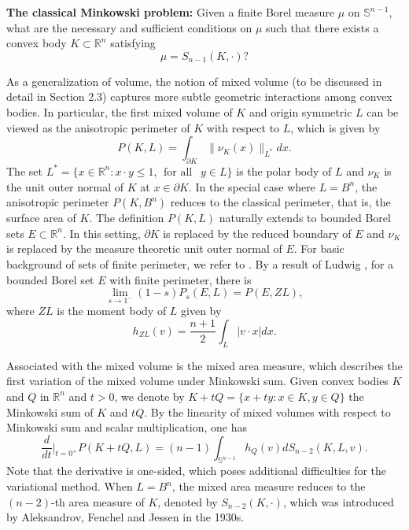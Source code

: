 \documentclass[12pt, oneside,reqno]{amsart}
\numberwithin{equation}{section}
\newtheorem{definition and theorem}[theorem]{Definition and Theorem}
\theoremstyle{plain}
\theoremstyle{remark}
\theoremstyle{definition}
\newcommand{\sn}{{\mathbb S}^{n-1}}
\newcommand{\rn}{\mathbb R^n}
\begin{document}
\noindent\textbf{The classical Minkowski problem:} Given a finite Borel measure $ \mu $ on $ \sn $, what are the necessary and sufficient conditions on $ \mu $ such that there exists a convex body $ K \subset \mathbb{R}^n $ satisfying
\[
\mu = S_{n-1}(K, \cdot)?
\]


As a generalization of volume, the notion of mixed volume (to be discussed in detail in Section 2.3) captures more subtle geometric interactions among convex bodies. In particular,  the first mixed volume of $K$ and origin symmetric $L$ can be viewed as the anisotropic perimeter of $K$ with respect to $L$, which is given by
\begin{equation}\label{ani per}
P(K,L)=\int_{\partial K}\|\nu_K(x)\|_{L^*}dx.
\end{equation}
The set $L^*=\{x\in\rn: x\cdot y  \leq 1,~~\text{for all }~~y\in L\}$ is the polar body of $L$ and $\nu_K$ is the unit outer normal of $K$ at $x\in\partial K$. In the special case where $L=B^n$, the anisotropic perimeter $P(K,B^n)$ reduces to the classical perimeter, that is, the surface area of $K$. 
The definition  
$P(K,L)$ naturally extends to bounded Borel sets $E\subset \rn$. In this setting, $\partial K$ is replaced by the reduced boundary of $E$ and $\nu_K$ is replaced by the measure theoretic unit outer normal of $E$. For basic background of sets of finite perimeter, we refer to \cite{Maggi}. By a result of Ludwig \cite{Lud1}, for a bounded Borel set $E$ with finite perimeter, there is
\[\lim_{s\rightarrow 1^-}(1-s)P_s(E,L)=P(E,ZL),\]
where $ZL$ is the moment body of $L$ given by
\[h_{ZL}(v)=\frac{n+1}{2}\int_{L}| v\cdot x |dx.\]

Associated with the mixed volume is the mixed area measure,  which describes the first variation of the mixed volume under Minkowski sum. Given convex bodies $K$ and $Q$ in $\rn$ and $t>0$, we denote by $K+tQ=\{x+ty: x\in K, y\in Q\}$ the Minkowski sum of $K$ and $tQ$. By the linearity of mixed volumes with respect to Minkowski sum and scalar multiplication, one has
\[\frac{d}{dt}\Big|_{t=0^+}P(K+tQ,L)=(n-1)\int_{\sn}h_Q(v)dS_{n-2}(K,L,v).\]
Note that the derivative is one-sided, which poses additional difficulties for the variational method. 
When $L=B^n$, the mixed area measure reduces to the $(n-2)$-th area measure of $K$, denoted by $S_{n-2}(K,\cdot)$, which was introduced by Aleksandrov, Fenchel and Jessen in the 1930s. 
\end{document}
